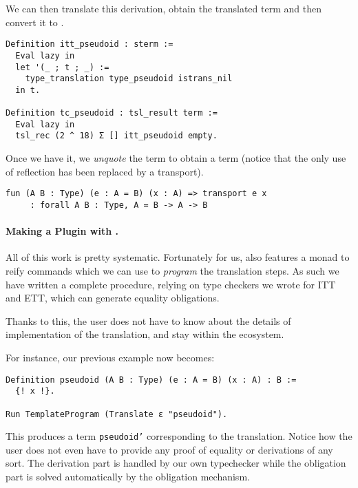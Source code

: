 %
We can then translate this derivation, obtain the translated term and then
convert it to \MetaCoq.
%
\begin{verbatim}
Definition itt_pseudoid : sterm :=
  Eval lazy in
  let '(_ ; t ; _) :=
    type_translation type_pseudoid istrans_nil
  in t.

Definition tc_pseudoid : tsl_result term :=
  Eval lazy in
  tsl_rec (2 ^ 18) Σ [] itt_pseudoid empty.
\end{verbatim}
%
Once we have it, we \emph{unquote} the term to obtain a \Coq term
(notice that the only use of reflection has been replaced by a transport).
%
\begin{verbatim}
fun (A B : Type) (e : A = B) (x : A) => transport e x
     : forall A B : Type, A = B -> A -> B
\end{verbatim}

\paragraph{Making a Plugin with \MetaCoq.}
%
All of this work is pretty systematic. Fortunately for us,
\MetaCoq also features a monad to reify \Coq commands which we can
use to \emph{program} the translation steps.
As such we have written a complete procedure, relying on type checkers we
wrote for \acrshort{ITT} and \acrshort{ETT}, which can generate equality
obligations.

Thanks to this, the user does not have to know about the details of
implementation of the translation, and stay within the \Coq ecosystem.

For instance, our previous example now becomes:
%
\begin{verbatim}
Definition pseudoid (A B : Type) (e : A = B) (x : A) : B :=
  {! x !}.

Run TemplateProgram (Translate ε "pseudoid").
\end{verbatim}
%
This produces a \Coq term \texttt{pseudoid'} corresponding to the
translation.
Notice how the user does not even have to provide any proof of equality or
derivations of any sort. The derivation part is handled by our own typechecker
while the obligation part is solved automatically by the \Coq obligation mechanism.

